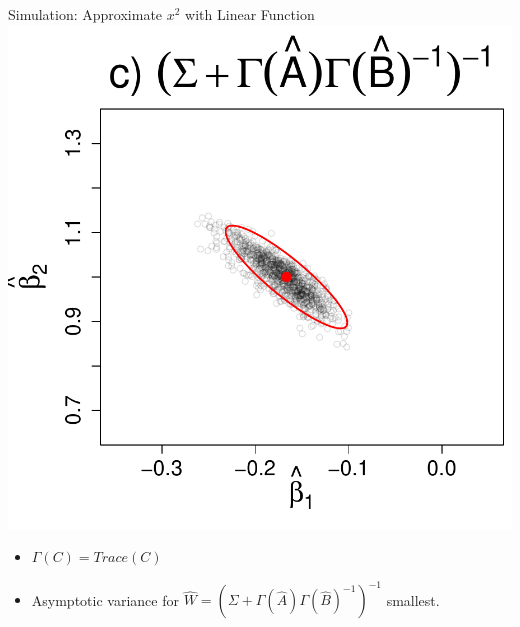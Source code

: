 \documentclass[12pt]{beamer}
\begin{document}
\begin{frame}{Simulation: Approximate $x^2$ with Linear Function}
\includegraphics[scale=\tw]{figs/pres_estimator_dls.pdf}

\begin{center}
  \begin{itemize}
    \item $\Gamma(C) = Trace(C)$
    \item Asymptotic variance for $\widehat{W} = (\Sigma + \Gamma(\widehat{A})\Gamma(\widehat{B})^{-1})^{-1}$ smallest.
  \end{itemize}
\end{center}

\end{frame}





  
\end{document}

